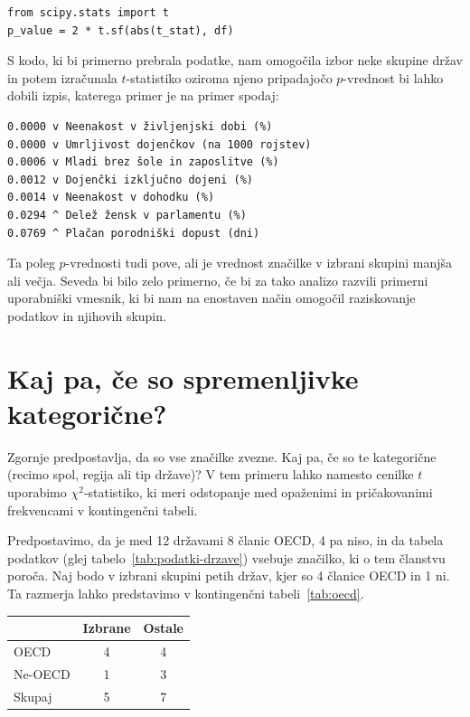 \vspace*{3mm}
\begin{lstlisting}
from scipy.stats import t
p_value = 2 * t.sf(abs(t_stat), df)
\end{lstlisting}

S kodo, ki bi primerno prebrala podatke, nam omogočila izbor neke skupine držav in potem izračunala $t$-statistiko oziroma njeno pripadajočo $p$-vrednost bi lahko dobili izpis, katerega primer je na primer spodaj:
\vspace*{3mm}
\begin{lstlisting}
0.0000 v Neenakost v življenjski dobi (%)
0.0000 v Umrljivost dojenčkov (na 1000 rojstev)
0.0006 v Mladi brez šole in zaposlitve (%)
0.0012 v Dojenčki izključno dojeni (%)
0.0014 v Neenakost v dohodku (%)
0.0294 ^ Delež žensk v parlamentu (%)
0.0769 ^ Plačan porodniški dopust (dni)
\end{lstlisting}
Ta poleg $p$-vrednosti tudi pove, ali je vrednost značilke v izbrani skupini manjša ali večja. Seveda bi bilo zelo primerno, če bi za tako analizo razvili primerni uporabniški vmesnik, ki bi nam na enostaven način omogočil raziskovanje podatkov in njihovih skupin.

\section{Kaj pa, če so spremenljivke kategorične?}

Zgornje predpostavlja, da so vse značilke zvezne. Kaj pa, če so te kategorične (recimo spol, regija ali tip države)? V tem primeru lahko namesto cenilke $t$ uporabimo $\chi^2$-statistiko, ki meri odstopanje med opaženimi in pričakovanimi frekvencami v kontingenčni tabeli.

Predpostavimo, da je med 12 državami 8 članic OECD, 4 pa niso, in da tabela podatkov (glej tabelo~\ref{tab:podatki-drzave}) vsebuje značilko, ki o tem članstvu poroča. Naj bodo v izbrani skupini petih držav, kjer so 4 članice OECD in 1 ni. Ta razmerja lahko predstavimo v kontingenčni tabeli~\ref{tab:oecd}.

\begin{margintable}
\caption{Kontingenčna tabela članstva v OECD.}
\begin{center}
\small
\begin{tabular}{lcc}
\toprule
 & Izbrane & Ostale \\
\midrule
OECD     & 4 & 4 \\
Ne-OECD  & 1 & 3 \\
\midrule
Skupaj   & 5 & 7 \\
\bottomrule
\end{tabular}
\end{center}
\label{tab:oecd}
\end{margintable}

